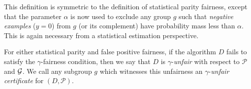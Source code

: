 \begin{remark}
  This definition is symmetric to the definition of statistical parity
  fairness, except that the parameter $\alpha$ is now used to exclude
  any group $g$ such that \emph{negative examples} ($y = 0$) from
  $g$ (or its complement) have probability mass less than
  $\alpha$. This is again necessary from a statistical estimation perspective.
\end{remark}

For either statistical parity and false positive fairness, if the
algorithm $D$ fails to satisfy the $\gamma$-fairness condition, then
we say that $D$ is $\gamma$-\emph{unfair} with respect to
$\mathcal{P}$ and $\mathcal{G}$. We call any subgroup $g$ which witnesses this
unfairness an $\gamma$-\emph{unfair certificate} for
$(D, \mathcal{P})$.






